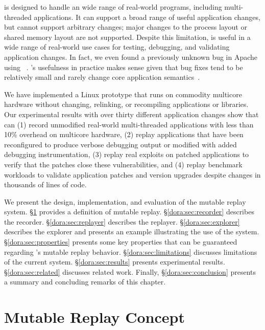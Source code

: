 {\dora} is designed to handle an wide range of real-world programs,
including multi-threaded applications. It can support a broad range
of useful application changes, but cannot support arbitrary
changes; major changes to the process layout or shared memory
layout are not supported. Despite this limitation,
{\dora} is useful in a wide range of real-world use cases for
testing, debugging, and validating application changes.  In fact, we
even found a previously unknown bug in Apache using {\dora}~\cite{apache-bug-53131}.
{\dora}'s usefulness in practice makes sense given
that bug fixes tend to be relatively small and rarely change core
application semantics~\cite{delta,mreplay-feas}.

We have implemented a {\dora} Linux prototype that runs on
commodity multicore hardware without changing, relinking, or
recompiling applications or libraries.  Our experimental results with
over thirty different application changes show that {\dora} can (1)
record unmodified real-world multi-threaded applications with less
than 10\% overhead on multicore hardware, (2) replay applications that
have been reconfigured to produce verbose debugging output or modified
with added debugging instrumentation, (3) replay real exploits on
patched applications to verify that the patches close these
vulnerabilities, and (4) replay benchmark workloads to validate
application patches and version upgrades despite changes in thousands of lines
of code.

We present the design, implementation, and evaluation of the
{\dora} mutable replay system.
\S\ref{dora:sec:definition} provides a definition of mutable replay.
\S\ref{dora:sec:recorder} describes the {\dora} recorder.
\S\ref{dora:sec:replayer} describes the {\dora} replayer.
\S\ref{dora:sec:explorer} describes the {\dora} explorer and presents an
example illustrating the use of the system.
\S\ref{dora:sec:properties} presents some key properties that can be guaranteed regarding
{\dora}'s mutable replay behavior.
\S\ref{dora:sec:limitations} discusses limitations of the current system.
\S\ref{dora:sec:results} presents experimental results.
\S\ref{dora:sec:related} discusses related work.
Finally, \S\ref{dora:sec:conclusion} presents a summary and concluding remarks of this chapter.

\section{Mutable Replay Concept}
\label{dora:sec:definition}

